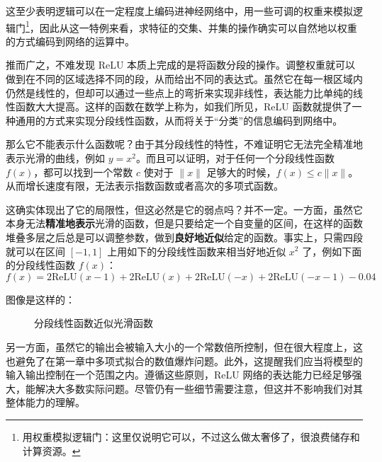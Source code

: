 这至少表明逻辑可以在一定程度上编码进神经网络中，用一些可调的权重来模拟逻辑门\footnote{用权重模拟逻辑门：这里仅说明它可以，不过这么做太奢侈了，很浪费储存和计算资源。}，因此从这一特例来看，求特征的交集、并集的操作确实可以自然地以权重的方式编码到网络的运算中。

推而广之，不难发现 ReLU 本质上完成的是将函数分段的操作。调整权重就可以做到在不同的区域选择不同的段，从而给出不同的表达式。虽然它在每一根区域内仍然是线性的，但却可以通过一些点上的弯折来实现非线性，表达能力比单纯的线性函数大大提高。这样的函数在数学上称为，如我们所见，ReLU 函数就提供了一种通用的方式来实现分段线性函数，从而将关于“分类”的信息编码到网络中。

那么它不能表示什么函数呢？由于其分段线性的特性，不难证明它无法完全精准地表示光滑的曲线，例如 $y = x^2$。而且可以证明，对于任何一个分段线性函数 $f(x)$，都可以找到一个常数 $c$ 使对于 $\|x\|$ 足够大的时候，$f(x) \leq c\|x\|$。从而增长速度有限，无法表示指数函数或者高次的多项式函数。

这确实体现出了它的局限性，但这必然是它的弱点吗？并不一定。一方面，虽然它本身无法\textbf{精准地表示}光滑的函数，但是只要给定一个自变量的区间，在这样的函数堆叠多层之后总是可以调整参数，做到\textbf{良好地近似}给定的函数。事实上，只需四段就可以在区间 $[-1, 1]$ 上用如下的分段线性函数来相当好地近似 $x^2$ 了，例如下面的分段线性函数 $f(x)$：
\[
    f(x) = 2\text{ReLU}(x-1) + 2\text{ReLU}(x) + 2\text{ReLU}(-x) + 2\text{ReLU}(-x-1) - 0.04
\]

图像是这样的：
\begin{figure}[H]
    \centering
    \caption{分段线性函数近似光滑函数}
\end{figure}

另一方面，虽然它的输出会被输入大小的一个常数倍所控制，但在很大程度上，这也避免了在第一章中多项式拟合的数值爆炸问题。此外，这提醒我们应当将模型的输入输出控制在一个范围之内。遵循这些原则，ReLU 网络的表达能力已经足够强大，能解决大多数实际问题。尽管仍有一些细节需要注意，但这并不影响我们对其整体能力的理解。

